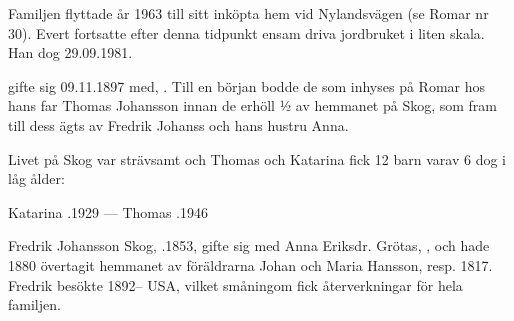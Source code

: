 Familjen flyttade år 1963 till sitt inköpta hem vid Nylandsvägen (se Romar nr 30). Evert fortsatte efter denna tidpunkt ensam driva jordbruket i liten skala. Han dog 29.09.1981.


%
 gifte sig 09.11.1897 med, . Till en början bodde de som inhyses på Romar hos hans far Thomas Johansson innan de erhöll ½ av hemmanet på Skog, som fram till dess ägts av Fredrik Johanss och hans hustru Anna.

Livet på Skog var strävsamt och Thomas och Katarina fick 12 barn varav 6 dog i låg ålder:
\begin{jhchildren}
  \item {}
  \item {}
  \item {}
  \item {}
  \item {}
  \item {}
  \item {}
  \item {}
  \item {}
  \item {}
  \item {}
  \item {}
\end{jhchildren}

Katarina .1929 --- Thomas .1946


%
Fredrik Johansson Skog, .1853, gifte sig med Anna Eriksdr. Grötas,  , och hade 1880 övertagit hemmanet av föräldrarna Johan och Maria Hansson,  resp. 1817. Fredrik besökte 1892-- USA, vilket småningom fick återverkningar för hela familjen.

